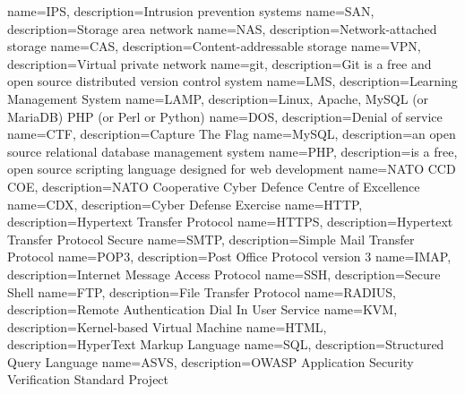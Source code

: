 {
  name=IPS,
  description={Intrusion prevention systems}
}
{
  name=SAN,
  description={Storage area network}
}
{
  name=NAS,
  description={Network-attached storage}
}
{
  name=CAS,
  description={Content-addressable storage}
}
{
  name=VPN,
  description={Virtual private network}
}
{
  name=git,
  description={Git is a free and open source distributed version control system}
}
{
  name=LMS,
  description={Learning Management System}
}
{
  name=LAMP,
  description={Linux, Apache, MySQL (or MariaDB) PHP (or Perl or Python)}
}
{
  name=DOS,
  description={Denial of service}
}
{
  name=CTF,
  description={Capture The Flag}
}
{
  name=MySQL,
  description={an open source relational database management system}
}
{
  name=PHP,
  description={is a free, open source scripting language designed for web development}
}
{
  name=NATO CCD COE,
  description={NATO Cooperative Cyber Defence Centre of Excellence}
}
{
  name=CDX,
  description={Cyber Defense Exercise}
}
{
  name=HTTP,
  description={Hypertext Transfer Protocol}
}
{
  name=HTTPS,
  description={Hypertext Transfer Protocol Secure}
}
{
  name=SMTP,
  description={Simple Mail Transfer Protocol}
}
{
  name=POP3,
  description={Post Office Protocol version 3}
}
{
  name=IMAP,
  description={Internet Message Access Protocol}
}
{
  name=SSH,
  description={Secure Shell}
}
{
  name=FTP,
  description={File Transfer Protocol}
}
{
  name=RADIUS,
  description={Remote Authentication Dial In User Service}
}
{
  name=KVM,
  description={Kernel-based Virtual Machine}
}
{
  name=HTML,
  description={HyperText Markup Language}
}
{
  name=SQL,
  description={Structured Query Language}
}
{
  name=ASVS,
  description={\gls{OWASP} Application Security Verification Standard Project}
}